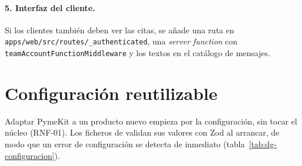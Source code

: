 \paragraph{5. Interfaz del cliente.} Si los clientes también deben ver las
citas, se añade una ruta en \texttt{apps/web/src/routes/\_authenticated}, una
\textit{server function} con \texttt{teamAccountFunctionMiddleware} y los
textos en el catálogo de mensajes.

\section{Configuración reutilizable}
\label{sec:dg-configuracion}

Adaptar PymeKit a un producto nuevo empieza por la configuración, sin tocar el
núcleo (RNF-01). Los ficheros de  validan sus
valores con Zod al arrancar, de modo que un error de configuración se detecta
de inmediato (tabla~\ref{tab:dg-configuracion}).

